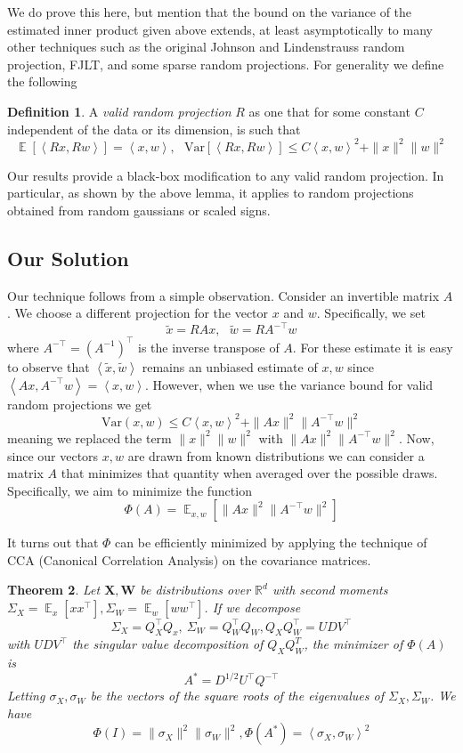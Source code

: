 \documentclass{article}
\newtheorem{theorem}{Theorem}[section]
\theoremstyle{definition}
\newtheorem{definition}[theorem]{Definition}
\theoremstyle{plain}
\newcommand{\R}{\mathbb{R}}
\newcommand{\X}{\mathbf{X}}
\newcommand{\W}{\mathbf{W}}
\newcommand{\Var}{\text{Var}}
\DeclareMathOperator{\E}{\mathbb{E}}
\newcommand{\ip}[1]{\left \langle #1 \right \rangle}
\begin{document}
We do prove this here, but mention that the bound on the variance of the estimated inner product given above extends, at least asymptotically to many other techniques such as the original Johnson and Lindenstrauss random projection, FJLT, and some sparse random projections. For generality we define the following 
\begin{definition}
A \emph{valid random projection} $R$ as one that for some constant $C$ independent of the data or its 
dimension, is such that 
$$ \E[\ip{Rx,Rw}] = \ip{x,w} , \ \ \  \Var[\ip{Rx,Rw}] \leq C \ip{x,w}^2 + \|x\|^2\|w\|^2 $$
\end{definition}
Our results provide a black-box modification to any valid random projection. In particular, as shown by the above lemma, it applies to random projections obtained from random gaussians or scaled signs.


\subsection{Our Solution}
Our technique follows from a simple observation. Consider an invertible matrix $A$. We choose a different projection for the vector $x$ and $w$. Specifically, we set 
$$ \tilde{x} = RAx, \ \ \ \tilde{w} = RA^{-\top}w $$
where $A^{-\top} = (A^{-1})^\top$ is the inverse transpose of $A$. For these estimate it is easy to observe that $\ip{\tilde{x},\tilde{w}}$ remains an unbiased estimate of $x,w$ since $\ip{Ax, A^{-\top}w}=\ip{x,w}$. However, when we use the variance bound for valid random projections we get 
$$\Var(x,w) \leq C \ip{x,w}^2 + \|Ax\|^2\|A^{-\top}w\|^2$$
meaning we replaced the term $\|x\|^2\|w\|^2$ with $\|Ax\|^2 \|A^{-\top}w\|^2$. Now, since our vectors $x,w$ are drawn from known distributions we can consider a matrix $A$ that minimizes that quantity when averaged over the possible draws. Specifically, we aim to minimize the function
$$\Phi(A) = \E_{x,w}\left[\|Ax\|^2\|A^{-\top}w\|^2\right]$$

It turns out that $\Phi$ can be efficiently minimized by applying the technique of CCA (Canonical Correlation Analysis) on the covariance matrices.

\begin{theorem} \label{thm:full}
Let $\X,\W$ be distributions over $\R^d$ with second moments $\Sigma_X=\E_x[xx^\top], \Sigma_W=\E_w[ww^\top]$. If we decompose 
$$ \Sigma_X = Q_X^\top Q_x, \ \Sigma_W = Q_W^\top Q_W, Q_XQ_W^\top = UDV^\top $$
with $UDV^\top$ the singular value decomposition of $Q_XQ_W^T$, the minimizer of $\Phi(A)$ is 
$$  A^* = D^{1/2} U^\top Q^{-\top}$$
Letting $\sigma_X, \sigma_W$ be the vectors of the square roots of the eigenvalues of $\Sigma_X, \Sigma_W$. We have
$$ \Phi(I) = \|\sigma_X\|^2 \|\sigma_W\|^2, \Phi(A^*) = \ip{\sigma_X, \sigma_W}^2 $$
\end{theorem}
\end{document}
